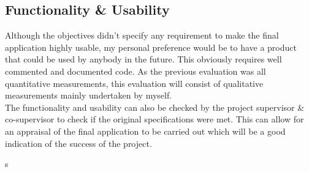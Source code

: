 \documentclass[a4paper, titlepage]{article}
\begin{document}
\subsection{Functionality \& Usability}
Although the objectives didn't specify any requirement to make the final application highly usable, my personal preference would be to have a product that could be used by anybody in the future. This obviously requires well commented and documented code. As the previous evaluation was all quantitative measurements, this evaluation will consist of qualitative measurements mainly undertaken by myself. \\
\newline
The functionality and usability can also be checked by the project supervisor \& co-supervisor to check if the original specifications were met. This can allow for an appraisal of the final application to be carried out which will be a good indication of the success of the project. \cite{middlebox}

\newpage

s



\end{document}
